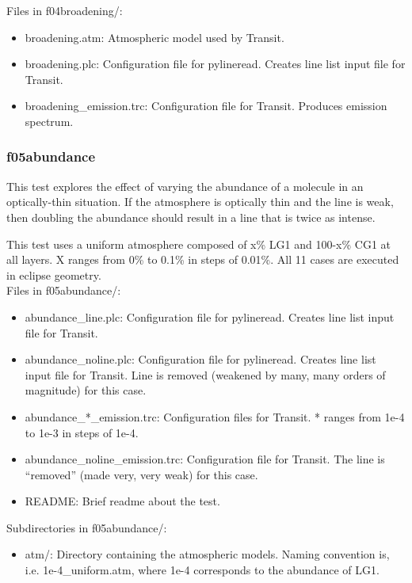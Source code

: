 \documentclass[letterpaper, 12pt]{article}
\begin{document}
Files in f04broadening/:
\begin{itemize} \itemsep0pt
  \item broadening.atm: Atmospheric model used by Transit.
  \item broadening.plc: Configuration file for pylineread. Creates line 
        list input file for Transit.
  \item broadening{\_}emission.trc: Configuration file for Transit. Produces 
        emission spectrum.
\end{itemize}

\subsubsection{f05abundance}
\label{sec:abundance}
This test explores the effect of varying the abundance of a molecule in an 
optically-thin situation. If the atmosphere is optically thin and the line 
is weak, then doubling the abundance should result in a line that is twice as 
intense.

This test uses a uniform atmosphere composed of x\% LG1 and 100-x\% CG1 at 
all layers. X ranges from 0\% to 0.1\% in steps of 0.01\%. All 11 cases 
are executed in eclipse geometry.\\

Files in f05abundance/:
\begin{itemize} \itemsep0pt
  \item abundance{\_}line.plc: Configuration file for pylineread. Creates 
        line list input file for Transit.
  \item abundance{\_}noline.plc: Configuration file for pylineread. 
        Creates line list input file for Transit. Line is removed (weakened 
        by many, many orders of magnitude) for this case.
  \item abundance{\_}*{\_}emission.trc: Configuration files for Transit. * 
        ranges from 1e-4 to 1e-3 in steps of 1e-4.
  \item abundance{\_}noline{\_}emission.trc: Configuration file for Transit. 
        The line is ``removed'' (made very, very weak) for this case.
  \item README: Brief readme about the test.
\end{itemize}

Subdirectories in f05abundance/:
\begin{itemize} \itemsep0pt
  \item atm/: Directory containing the atmospheric models. Naming convention 
        is, i.e. 1e-4{\_}uniform.atm, where 1e-4 corresponds to the abundance 
of LG1.
\end{itemize}
\end{document}
